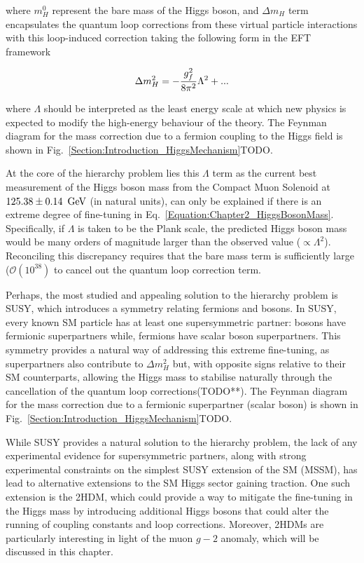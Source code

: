 where $m_H^0$ represent the bare mass of the Higgs boson, and $\Delta m_H$ term encapsulates the quantum loop corrections from these virtual particle interactions with this loop-induced correction taking the following form in the EFT framework

\begin{equation}
    \Delta m_H^2 = -\frac{g_f^2}{8\pi^2}\Lambda^2 + \space \text{...}
\end{equation}

where $\Lambda$ should be interpreted as the least energy scale at which new physics is expected to modify the high-energy behaviour of the theory. The Feynman diagram for the mass correction due to a fermion coupling to the Higgs field is shown in Fig.~\ref{Section:Introduction_HiggsMechanism}TODO.

At the core of the hierarchy problem lies this $\Lambda$ term as the current best measurement of the Higgs boson mass from the Compact Muon Solenoid at $125.38 \pm 0.14~\,\text{Ge\hspace{-.08em}V}$ (in natural units), can only be explained if there is an extreme degree of fine-tuning in Eq.~\ref{Equation:Chapter2_HiggsBosonMass}. Specifically, if $\Lambda$ is taken to be the Plank scale, the predicted Higgs boson mass would be many orders of magnitude larger than the observed value ($\propto \Lambda^2$). Reconciling this discrepancy requires that the bare mass term is sufficiently large ($\mathcal{O}(10^{38})$ to cancel out the quantum loop correction term.

Perhaps, the most studied and appealing solution to the hierarchy problem is \ac{SUSY}, which introduces a symmetry relating fermions and bosons. In SUSY, every known SM particle has at least one supersymmetric partner: bosons have fermionic superpartners while, fermions have scalar boson superpartners. This symmetry provides a natural way of addressing this extreme fine-tuning, as superpartners also contribute to $\Delta m_H^2$ but, with opposite signs relative to their SM counterparts, allowing the Higgs mass to stabilise naturally through the cancellation of the quantum loop corrections(TODO**). The Feynman diagram for the mass correction due to a fermionic superpartner (scalar boson) is shown in Fig.~\ref{Section:Introduction_HiggsMechanism}TODO.

While SUSY provides a natural solution to the hierarchy problem, the lack of any experimental evidence for supersymmetric partners, along with strong experimental constraints on the simplest SUSY extension of the SM (MSSM), has lead to alternative extensions to the SM Higgs sector gaining traction. One such extension is the \ac{2HDM}, which could provide a way to mitigate the fine-tuning in the Higgs mass by introducing additional Higgs bosons that could alter the running of coupling constants and loop corrections. Moreover, 2HDMs are particularly interesting in light of the muon $g-2$ anomaly, which will be discussed in this chapter.

